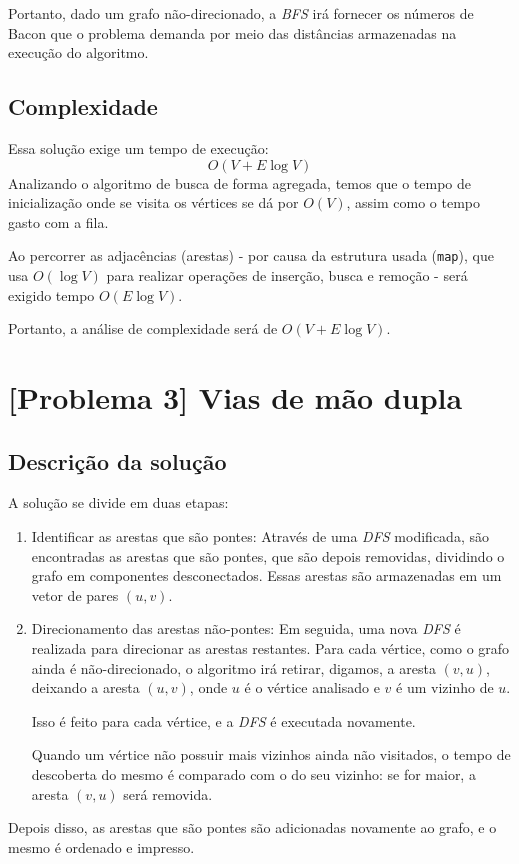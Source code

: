 \documentclass[12pt, letterpaper]{article}
\begin{document}
            Portanto, dado um grafo não-direcionado, a \emph{BFS} irá fornecer os números de Bacon que o problema demanda por meio das distâncias armazenadas na execução do algoritmo.

        \subsection{Complexidade}
            Essa solução exige um tempo de execução:
            $$ O(V + E\log{V}) $$
            Analizando o algoritmo de busca de forma agregada, temos que o tempo de inicialização onde se visita os vértices se dá por $O(V)$, assim como o tempo gasto com a fila.

            Ao percorrer as adjacências (arestas) - por causa da estrutura usada (\texttt{map}), que usa $O(\log{V})$ para realizar operações de inserção, busca e remoção - será exigido tempo $O(E\log{V})$.

            Portanto, a análise de complexidade será de $O(V + E\log{V})$.
    \section{[Problema 3] Vias de mão dupla}
        \subsection{Descrição da solução}
            A solução se divide em duas etapas:
            \begin{enumerate}
                \item Identificar as arestas que são pontes:
                    Através de uma \emph{DFS} modificada, são encontradas as arestas que são pontes, que são depois removidas, dividindo o grafo em componentes desconectados. Essas arestas são armazenadas em um vetor de pares $(u, v)$.
                \item Direcionamento das arestas não-pontes:
                    Em seguida, uma nova \emph{DFS} é realizada para direcionar as arestas restantes. Para cada vértice, como o grafo ainda é não-direcionado, o algoritmo irá retirar, digamos, a aresta $(v, u)$, deixando a aresta $(u, v)$, onde $u$ é o vértice analisado e $v$ é um vizinho de $u$.

                    Isso é feito para cada vértice, e a \emph{DFS} é executada novamente.

                    Quando um vértice não possuir mais vizinhos ainda não visitados, o tempo de descoberta do mesmo é comparado com o do seu vizinho: se for maior, a aresta $(v, u)$ será removida.
            \end{enumerate}
            Depois disso, as arestas que são pontes são adicionadas novamente ao grafo, e o mesmo é ordenado e impresso.
\end{document}
